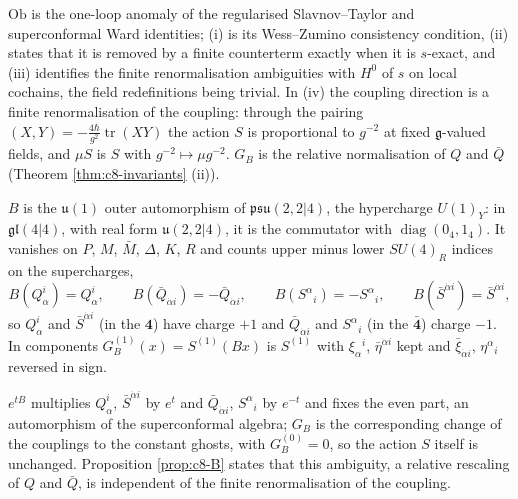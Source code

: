 \begin{remark}
$\mathrm{Ob}$ is the one-loop anomaly of the regularised Slavnov--Taylor and superconformal Ward identities; (i) is its Wess--Zumino consistency condition, (ii) states that it is removed by a finite counterterm exactly when it is $s$-exact, and (iii) identifies the finite renormalisation ambiguities with $H^0$ of $s$ on local cochains, the field redefinitions being trivial. In (iv) the coupling direction is a finite renormalisation of the coupling: through the pairing $(X,Y)=-\tfrac{4\hbar}{g^2}\operatorname{tr}(XY)$ the action $S$ is proportional to $g^{-2}$ at fixed $\mathfrak g$-valued fields, and $\mu S$ is $S$ with $g^{-2}\mapsto\mu g^{-2}$. $G_B$ is the relative normalisation of $Q$ and $\bar Q$ (Theorem \ref{thm:c8-invariants} (ii)).
\end{remark}

\begin{remark}
$B$ is the $\mathfrak u(1)$ outer automorphism of $\mathfrak{psu}(2,2|4)$, the hypercharge $U(1)_Y$: in $\mathfrak{gl}(4|4)$, with real form $\mathfrak u(2,2|4)$, it is the commutator with $\operatorname{diag}(0_4,1_4)$. It vanishes on $P$, $M$, $\bar M$, $\Delta$, $K$, $R$ and counts upper minus lower $SU(4)_R$ indices on the supercharges,
\[
B(Q^i_\alpha)=Q^i_\alpha,\qquad B(\bar Q_{\dot\alpha i})=-\bar Q_{\dot\alpha i},\qquad B(S^\alpha{}_i)=-S^\alpha{}_i,\qquad B(\bar S^{\dot\alpha i})=\bar S^{\dot\alpha i},
\]
so $Q^i_\alpha$ and $\bar S^{\dot\alpha i}$ (in the $\mathbf4$) have charge $+1$ and $\bar Q_{\dot\alpha i}$ and $S^\alpha{}_i$ (in the $\bar{\mathbf4}$) charge $-1$. In components $G_B^{(1)}(x)=S^{(1)}(Bx)$ is $S^{(1)}$ with $\xi_\alpha{}^i$, $\bar\eta^{\dot\alpha i}$ kept and $\bar\xi_{\dot\alpha i}$, $\eta^\alpha{}_i$ reversed in sign.
\end{remark}

\begin{remark}
$e^{tB}$ multiplies $Q^i_\alpha$, $\bar S^{\dot\alpha i}$ by $e^t$ and $\bar Q_{\dot\alpha i}$, $S^\alpha{}_i$ by $e^{-t}$ and fixes the even part, an automorphism of the superconformal algebra; $G_B$ is the corresponding change of the couplings to the constant ghosts, with $G_B^{(0)}=0$, so the action $S$ itself is unchanged. Proposition \ref{prop:c8-B} states that this ambiguity, a relative rescaling of $Q$ and $\bar Q$, is independent of the finite renormalisation of the coupling.
\end{remark}

